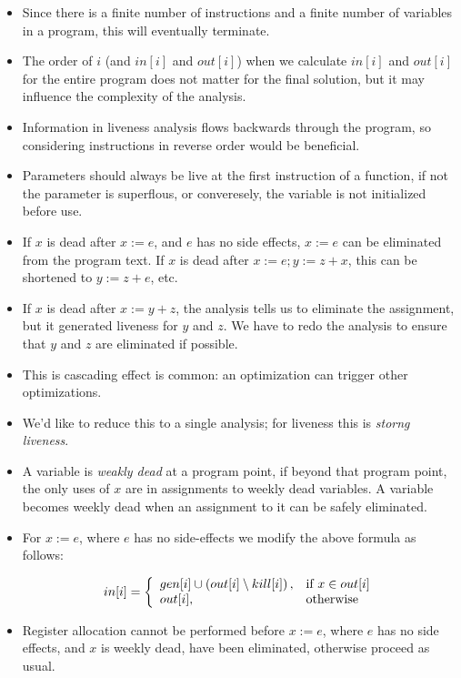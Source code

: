 \begin{itemize}
\item Since there is a finite number of instructions and a finite number of
variables in a program, this will eventually terminate.

\item The order of $i$ (and $in[i]$ and $out[i]$) when we calculate $in[i]$ and
$out[i]$ for the entire program does not matter for the final solution, but it
may influence the complexity of the analysis.

\item Information in liveness analysis flows backwards through the program, so
considering instructions in reverse order would be beneficial.

\item Parameters should always be live at the first instruction of a function,
if not the parameter is superflous, or converesely, the variable is not
initialized before use.

\item If $x$ is dead after $x:=e$, and $e$ has no side effects, $x:=e$ can be
eliminated from the program text. If $x$ is dead after $x:=e;y:=z+x$, this can
be shortened to $y:=z+e$, etc.

\item If $x$ is dead after $x:=y+z$, the analysis tells us to eliminate the
assignment, but it generated liveness for $y$ and $z$. We have to redo the
analysis to ensure that $y$ and $z$ are eliminated if possible.

\item This is cascading effect is common: an optimization can trigger other
optimizations.

\item We'd like to reduce this to a single analysis; for liveness this is
\emph{storng liveness}.

\item A variable is \emph{weakly dead} at a program point, if beyond that
program point, the only uses of $x$ are in assignments to weekly dead
variables. A variable becomes weekly dead when an assignment to it can be
safely eliminated.

\item For $x:=e$, where $e$ has no side-effects we modify the above formula as
follows:

\begin{align}
in[i]=\left\{
  \begin{array}{ll}
    gen[i] \cup \left({ out[i] \setminus kill[i] }\right), & \text{if}\ x \in out[i] \\
    out[i], &\text{otherwise}
  \end{array}
\right.
\end{align}

\item Register allocation cannot be performed before $x:=e$, where $e$ has no
side effects, and $x$ is weekly dead, have been eliminated, otherwise proceed
as usual.

\end{itemize}

